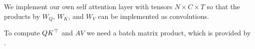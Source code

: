 \documentclass[c,8pt]{beamer}
\begin{document}
\begin{frame}{}{}

We implement our own self attention layer with tensors $N \times C
\times T$ so that the products by $W_Q$, $W_K$, and $W_V$
can be implemented as convolutions.


To compute $Q K^{\top}$ and $A V$ we need a batch matrix product,
which is provided by .








\end{frame}
\end{document}
